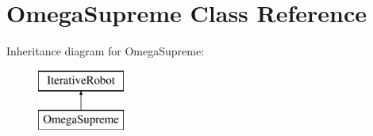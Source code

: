 \hypertarget{class_omega_supreme}{}\section{Omega\+Supreme Class Reference}
\label{class_omega_supreme}
Inheritance diagram for Omega\+Supreme\+:\begin{figure}[H]
\begin{center}
\leavevmode
\includegraphics[height=2.000000cm]{class_omega_supreme}
\end{center}
\end{figure}

